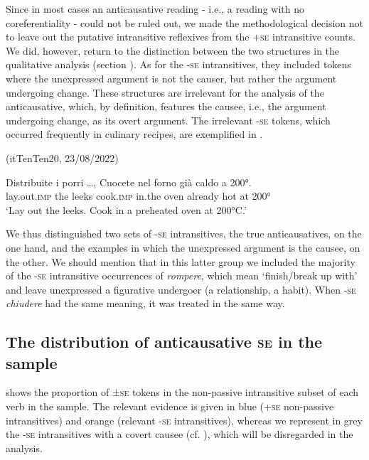 \documentclass[output=paper,colorlinks,citecolor=brown
]{langscibook}
\begin{document}
Since in most cases an anticausative reading - i.e., a reading with no coreferentiality - could not be ruled out, we made the methodological decision not to leave out the putative intransitive reflexives from the +\textsc{se} intransitive counts. We did, however, return to the distinction between the two structures in the qualitative analysis (section ).
As for the -\textsc{se} intransitives, they included tokens where the unexpressed argument is not the causer, but rather the argument undergoing change. These structures are irrelevant for the analysis of the anticausative, which, by definition, features the causee, i.e., the argument undergoing change, as its overt argument. The irrelevant -\textsc{se} tokens, which occurred frequently in culinary recipes, are exemplified in .


\hspace*{\fill}(itTenTen20, 23/08/2022)\quad

\ea \label{bentley_example_6}
\gll Distribuite i porri  \ldots , Cuocete nel forno già caldo a 200°. \\
    lay.out.\textsc{imp}	the	leeks {} cook.\textsc{imp} in.the oven already hot at 200° \\
\glt ‘Lay out the leeks. Cook in a preheated oven at 200°C.’ 
\z

We thus distinguished two sets of -\textsc{se} intransitives, the true anticausatives, on the one hand, and the examples in which the unexpressed argument is the causee, on the other. We should mention that in this latter group we included the majority of the -\textsc{se} intransitive occurrences of \textit{rompere}, which mean ‘finish/break up with’ and leave unexpressed a figurative undergoer (a relationship, a habit). When -\textsc{se} \textit{chiudere} had the same meaning, it was treated in the same way. 

\subsection{The distribution of anticausative \textsc{se} in the sample}
\label{bentley_section_3.2}
 shows the proportion of ±\textsc{se} tokens in the non-passive intransitive subset of each verb in the sample. The relevant evidence is given in blue (+\textsc{se} non-passive intransitives) and orange (relevant -\textsc{se} intransitives), whereas we represent in grey the -\textsc{se} intransitives with a covert causee (cf. ), which will be disregarded in the analysis.
\end{document}

